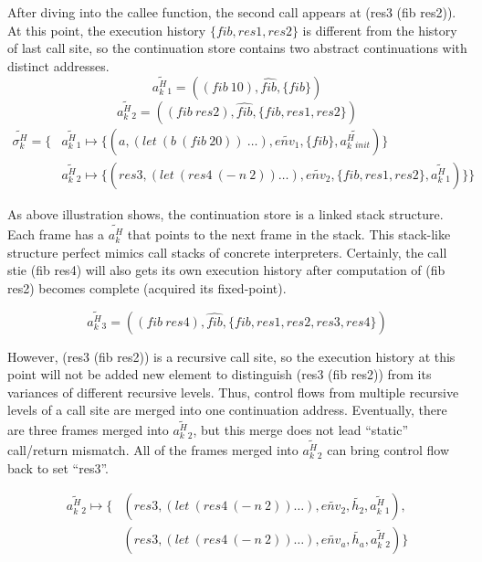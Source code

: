 \documentclass{article}
\begin{document}
After diving into the callee function, the second call appears at (res3 (fib res2)). At this point, the execution history $\{fib, res1, res2\}$ is different from the history of last call site, so the continuation store contains two abstract continuations with distinct addresses.
\[
\widetilde{a^H_k{}_1} = ((fib\ 10), \widehat{fib}, \{fib\})
\]
\[
\widetilde{a^H_k{}_2} = ((fib\ res2), \widehat{fib}, \{fib, res1, res2\})
\]
\[
\begin{aligned}
\label{eq:show-stack}
\widetilde{\sigma_k^H} = \{ {}& \widetilde{a^H_k{}_1} \mapsto \{(a, (let\ (b\ (fib\ 20))\ \dots), \widetilde{env_1}, \{fib\}, \widetilde{a^H_k{}_{init}})\}  {} \\
                              & \widetilde{a^H_k{}_2} \mapsto \{(res3, (let\ (res4\ (-\ n\ 2)) \dots), \widetilde{env_2}, \{fib, res1, res2\}, \widetilde{a^H_k{}_1})\} \}
\end{aligned}
\]

As above illustration shows, the continuation store is a linked stack structure. Each frame has a $\widetilde{a^H_k}$ that points to the next frame in the stack. This stack-like structure perfect mimics call stacks of concrete interpreters. Certainly, the call stie (fib res4) will also gets its own execution history after computation of (fib res2) becomes complete (acquired its fixed-point).

\[
\widetilde{a^H_k{}_3} = ((fib\ res4), \widehat{fib}, \{fib, res1, res2, res3, res4\})
\]

However, (res3 (fib res2)) is a recursive call site, so the execution history at this point will not be added new element to distinguish (res3 (fib res2)) from its variances of different recursive levels. Thus, control flows from multiple recursive levels of a call site are merged into one continuation address. Eventually, there are three frames merged into $\widetilde{a^H_k{}_2}$, but this merge does not lead ``static'' call/return mismatch. All of the frames merged into $\widetilde{a^H_k{}_2}$ can bring control flow back to set ``res3''.

\[
\begin{aligned}
\label{eq:show-stack}
\widetilde{a^H_k{}_2} \mapsto \{ {}& (res3, (let\ (res4\ (-\ n\ 2)) \dots), \widetilde{env_2}, \tilde{h_2}, \widetilde{a^H_k{}_1}), {} \\
                                 {}& (res3, (let\ (res4\ (-\ n\ 2)) \dots), \widetilde{env_a}, \tilde{h_a}, \widetilde{a^H_k{}_2}) \}
\end{aligned}
\]
\end{document}
